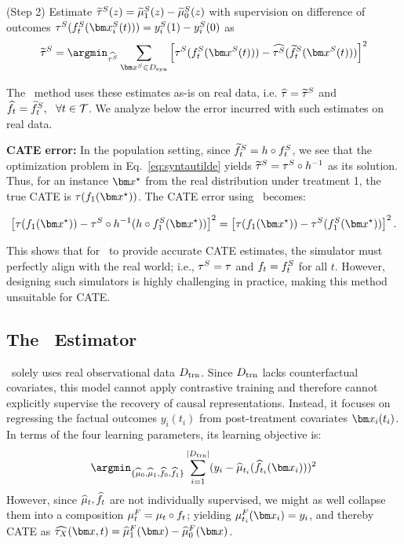 (Step 2) Estimate $\widetilde{\tau}^S(z) = \widetilde{\mu}^S_1(z) - \widetilde{\mu}^S_0(z)$ with supervision on difference of outcomes $\syntau(\SInv_t(\xb_i^S(t))) = \y_i^S(1) - y_i^S(0)$ as 
\begin{align}
    \syntauTilde = \argmin_{\widehat{\syntau}} \sum_{\xb^S \in \synD} \left[\syntau(\SInv_t(\xb^S(t))) -  \widehat{\syntau}(\SInvTilde_t(\xb^S(t)))\right]^2 \label{eq:syntautilde}
\end{align}



%
%
The \simonly\ method uses these estimates as-is on real data, i.e. $\widehat{\tau} = \widetilde{\tau}^S$ and $\widehat{f}_t = \widetilde{f}^S_t, ~~\forall t \in \mathcal{T}$. We analyze below the error incurred with such estimates on real data. 

\textbf{CATE error:} In the population setting, since $\widetilde{f}^S_t = h \circ f^S_t$, we see that the optimization problem in Eq.~\ref{eq:syntautilde} yields $\widetilde{\tau}^S = \tau^S \circ h^{-1}$ as its solution. 
Thus, for an instance $\xb^\star$ from the real distribution under treatment 1, the true CATE is $\tau(\RInv_1(\xb^\star))$. The CATE error using \simonly\ becomes:

$$
\left[ \tau(\RInv_1(\xb^\star)) - \syntau \circ h^{-1}(h \circ \SInv_1(\xb^\star)) \right]^2 = \left[ \tau(\RInv_1(\xb^\star)) - \syntau(\SInv_1(\xb^\star)) \right]^2.
$$

This shows that for \simonly\ to provide accurate CATE estimates, the simulator must perfectly align with the real world; i.e., $\tau^S = \tau$ and $f_t = f^S_t$ for all $t$. However, designing such simulators is highly challenging in practice, making this method unsuitable for CATE.




%



\subsection{The \realonly\ Estimator}
\realonly\ solely uses real observational data $D_{\text{trn}}$. Since $D_{\text{trn}}$ lacks counterfactual covariates, this model cannot apply contrastive training and therefore cannot explicitly supervise the recovery of causal representations. Instead, it focuses on regressing the factual outcomes $y_i(t_i)$ from post-treatment covariates $\xb_i(t_i)$. In terms of the four learning parameters, its learning objective is:
$$
    \argmin_{\{\realmuhat_0,\realmuhat_1 , \RInvhat_0, \RInvhat_1\}} 
    \sum_{i=1}^{|\trnD|}(y_i - \realmuhat_{t_i}(\RInvhat_{t_i}(\xb_i)))^2
$$
However, since $\widehat{\mu}_t, \widehat{f}_t$ are not individually supervised, we might as well collapse them into a composition $\mu_t^F= \mu_t \circ f_t$; yielding $\realmu_{t_i}^F(\xb_i) = y_i$, and thereby CATE as $\ITExhat(\xb, t) = \realmuhat^F_1(\xb) - \realmuhat^F_0(\xb)$. 

